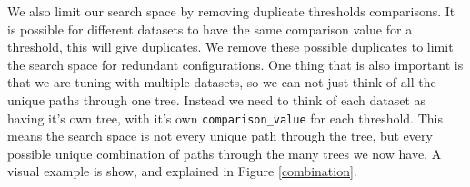 
We also limit our search space by removing duplicate thresholds comparisons. It is possible for different datasets to have the same comparison value for a threshold, this will give duplicates. We remove these possible duplicates to limit the search space for redundant configurations.
One thing that is also important is that we are tuning with multiple datasets,
so we can not just think of all the unique paths through one tree. Instead we
need to think of each dataset as having it's own tree, with it's own 
\texttt{comparison\_value} for each threshold. This means the search space is
not every unique path through the tree, but every possible unique combination
of paths through the many trees we now have. A visual example is show, and explained in Figure \ref{combination}. 


